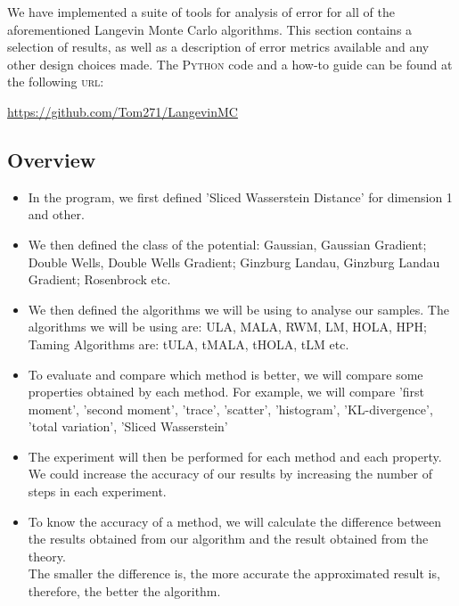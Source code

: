 We have implemented a suite of tools for analysis of error for all of the aforementioned Langevin Monte Carlo algorithms. This section contains a selection of results, as well as a description of error metrics available and any other design choices made. The \textsc{Python} code and a how-to
guide can be found at the following
\textsc{url}: \\

   \centerline{ \url{https://github.com/Tom271/LangevinMC}}

\subsection{Overview}\label{overviewprogram}
\begin{itemize}
\item In the program, we first defined 'Sliced Wasserstein Distance' for dimension 1 and other. \\
\item We then defined the class of the potential: Gaussian, Gaussian Gradient; Double Wells, Double Wells Gradient; Ginzburg Landau, Ginzburg Landau Gradient;     Rosenbrock etc.\\
\item We then defined the algorithms we will be using to analyse our samples. The algorithms we will be using are: ULA, MALA, RWM, LM, HOLA, HPH; Taming Algorithms are: tULA, tMALA, tHOLA, tLM etc.\\
\item To evaluate and compare which method is better, we will compare some properties obtained by each method. For example, we will compare 'first moment', 'second moment', 'trace', 'scatter', 'histogram', 'KL-divergence', 'total variation', 'Sliced Wasserstein' \\
\item The experiment will then be performed for each method and each property. We could increase the accuracy of our results by increasing the number of steps in each experiment. \\
\item To know the accuracy of a method, we will calculate the difference between the results obtained from our algorithm and the result obtained from the theory. \\ The smaller the difference is, the more accurate the approximated result is, therefore, the better the algorithm.\\
\end{itemize}
% 

